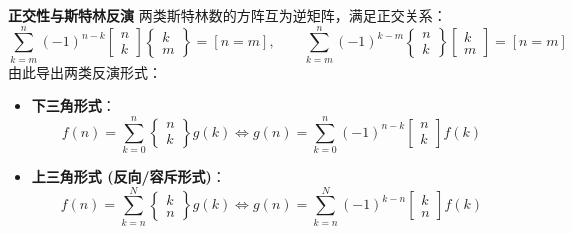 \textbf{正交性与斯特林反演}
两类斯特林数的方阵互为逆矩阵，满足正交关系：
\[
\sum_{k=m}^n (-1)^{n-k} \left[ \begin{matrix} n \\ k \end{matrix} \right] \left\{ \begin{matrix} k \\ m \end{matrix} \right\} = [n = m], \qquad
\sum_{k=m}^n (-1)^{k-m} \left\{ \begin{matrix} n \\ k \end{matrix} \right\} \left[ \begin{matrix} k \\ m \end{matrix} \right] = [n = m]
\]
由此导出两类反演形式：
\begin{itemize}
    \item \textbf{下三角形式}：
    \[
    f(n) = \sum_{k=0}^n \left\{ \begin{matrix} n \\ k \end{matrix} \right\} g(k) \iff g(n) = \sum_{k=0}^n (-1)^{n-k} \left[ \begin{matrix} n \\ k \end{matrix} \right] f(k)
    \]
    \item \textbf{上三角形式 (反向/容斥形式)}：
    \[
    f(n) = \sum_{k=n}^N \left\{ \begin{matrix} k \\ n \end{matrix} \right\} g(k) \iff g(n) = \sum_{k=n}^N (-1)^{k-n} \left[ \begin{matrix} k \\ n \end{matrix} \right] f(k)
    \]
\end{itemize}

